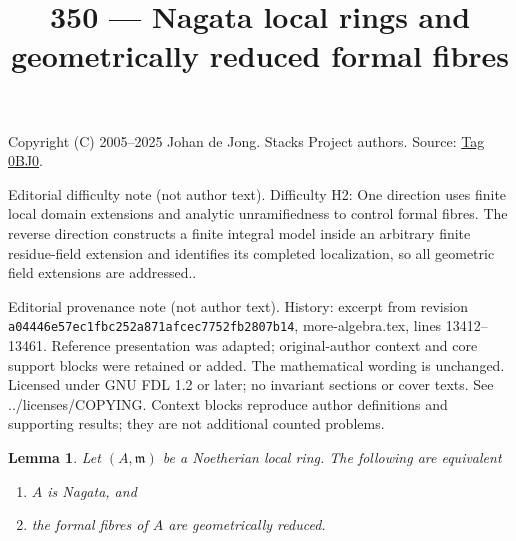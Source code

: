 \documentclass{amsart}
\theoremstyle{plain}
\newtheorem{lemma}[subsection]{Lemma}
\theoremstyle{definition}
\theoremstyle{remark}
\numberwithin{equation}{subsection}
\begin{document}
\title[Stacks Project, Tag 0BJ0]{350 --- Nagata local rings and geometrically reduced formal fibres}
\maketitle
\noindent Copyright (C) 2005--2025 Johan de Jong. Stacks Project authors. Source: \href{https://stacks.math.columbia.edu/tag/0BJ0}{Tag 0BJ0}.

\noindent Editorial difficulty note (not author text). Difficulty H2: One direction uses finite local domain extensions and analytic unramifiedness to control formal fibres. The reverse direction constructs a finite integral model inside an arbitrary finite residue-field extension and identifies its completed localization, so all geometric field extensions are addressed..

\noindent Editorial provenance note (not author text). History: excerpt from revision \texttt{a0444\allowbreak 6e57e\allowbreak c1fbc\allowbreak 252a8\allowbreak 71afc\allowbreak ec775\allowbreak 2fb28\allowbreak 07b14}, more-algebra.tex, lines 13412--13461. Reference presentation was adapted; original-author context and core support blocks were retained or added. The mathematical wording is unchanged. Licensed under GNU FDL 1.2 or later; no invariant sections or cover texts. See ../licenses/COPYING. Context blocks reproduce author definitions and supporting results; they are not additional counted problems.

\begin{lemma}
\label{lemma-Nagata-local-ring}
Let $(A, \mathfrak m)$ be a Noetherian local ring.
The following are equivalent
\begin{enumerate}
\item $A$ is Nagata, and
\item the formal fibres of $A$ are geometrically reduced.
\end{enumerate}
\end{lemma}
\end{document}
